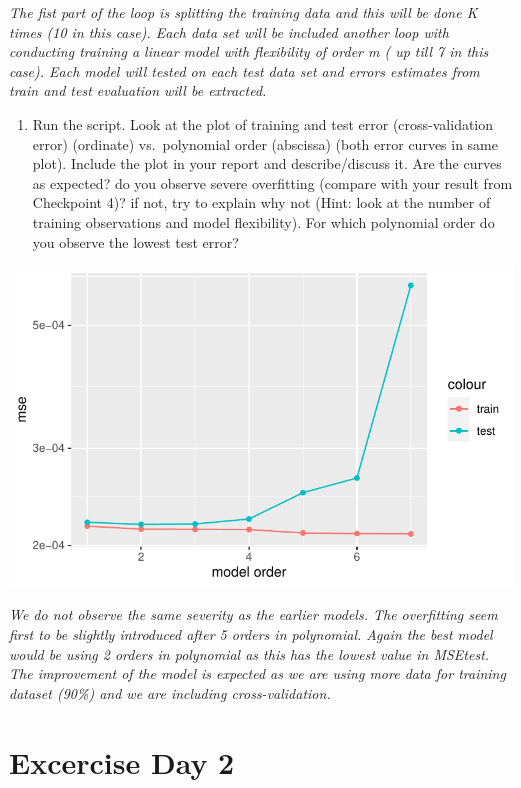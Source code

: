 \documentclass[
  letterpaper,
  DIV=11,
  numbers=noendperiod]{scrartcl}
\providecommand{\tightlist}{%
  \setlength{\itemsep}{0pt}\setlength{\parskip}{0pt}}\usepackage{longtable,booktabs,array}
\begin{document}
\emph{The fist part of the loop is splitting the training data and this
will be done K times (10 in this case). Each data set will be included
another loop with conducting training a linear model with flexibility of
order m ( up till 7 in this case). Each model will tested on each test
data set and errors estimates from train and test evaluation will be
extracted.}

\begin{enumerate}
\def\labelenumi{(\alph{enumi})}
\setcounter{enumi}{3}
\tightlist
\item
  Run the script. Look at the plot of training and test error
  (cross-validation error) (ordinate) vs.~polynomial order (abscissa)
  (both error curves in same plot). Include the plot in your report and
  describe/discuss it. Are the curves as expected? do you observe severe
  overfitting (compare with your result from Checkpoint 4)? if not, try
  to explain why not (Hint: look at the number of training observations
  and model flexibility). For which polynomial order do you observe the
  lowest test error?
\end{enumerate}

\includegraphics{excercise_doc_files/figure-pdf/unnamed-chunk-5-1.pdf}

\emph{We do not observe the same severity as the earlier models. The
overfitting seem first to be slightly introduced after 5 orders in
polynomial. Again the best model would be using 2 orders in polynomial
as this has the lowest value in MSEtest. The improvement of the model is
expected as we are using more data for training dataset (90\%) and we
are including cross-validation.}

\hypertarget{excercise-day-2}{%
\section{Excercise Day 2}\label{excercise-day-2}}
\end{document}

